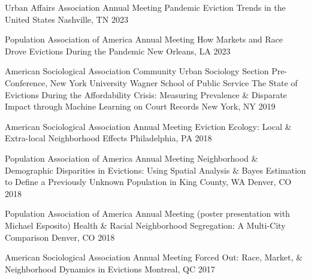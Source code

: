 
\begin{cventries}
    
  \cventry
    {Urban Affairs Association Annual Meeting} %
    {Pandemic Eviction Trends in the United States} %
    {Nashville, TN} %
    {2023} %
    {}    
    
  \cventry
    {Population Association of America Annual Meeting} %
    {How Markets and Race Drove Evictions During the Pandemic} %
    {New Orleans, LA} %
    {2023} %
    {}
    
  \cventry
    {American Sociological Association Community Urban Sociology Section Pre-Conference, New York University Wagner School of Public Service} %
    {The State of Evictions During the Affordability Crisis: Measuring Prevalence \& Disparate Impact through Machine Learning on Court Records} %
    {New York, NY} %
    {2019} %
    {}
    
  \cventry
    {American Sociological Association Annual Meeting} %
    {Eviction Ecology: Local \& Extra-local Neighborhood Effects} %
    {Philadelphia, PA} %
    {2018} %
    {}
    
  \cventry
    {Population Association of America Annual Meeting} %
    {Neighborhood \& Demographic Disparities in Evictions: Using Spatial Analysis \& Bayes Estimation to Define a Previously Unknown Population in King County, WA} %
    {Denver, CO} %
    {2018} %
    {}
    
  \cventry
    {Population Association of America Annual Meeting (poster presentation with Michael Esposito)} %
    {Health \& Racial Neighborhood Segregation: A Multi-City Comparison} %
    {Denver, CO} %
    {2018} %
    {}
    
  \cventry
    {American Sociological Association Annual Meeting} %
    {Forced Out: Race, Market, \& Neighborhood Dynamics in Evictions} %
    {Montreal, QC} %
    {2017} %
    {}


\end{cventries}
